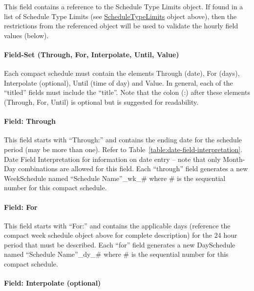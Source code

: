 This field contains a reference to the Schedule Type Limits object. If found in a list of Schedule Type Limits (see \hyperref[scheduletypelimits]{ScheduleTypeLimits} object above), then the restrictions from the referenced object will be used to validate the hourly field values (below).

\paragraph{Field-Set (Through, For, Interpolate, Until, Value)}\label{field-set-through-for-interpolate-until-value}

Each compact schedule must contain the elements Through (date), For (days), Interpolate (optional), Until (time of day) and Value. In general, each of the ``titled'' fields must include the ``title''. Note that the colon (:) after these elements (Through, For, Until) is optional but is suggested for readability.

\paragraph{Field: Through}\label{field-through}

This field starts with ``Through:'' and contains the ending date for the schedule period (may be more than one). Refer to Table~\ref{table:date-field-interpretation}. Date Field Interpretation for information on date entry -- note that only Month-Day combinations are allowed for this field. Each ``through'' field generates a new WeekSchedule named ``Schedule Name''\_wk\_\# where \# is the sequential number for this compact schedule.

\paragraph{Field: For}\label{field-for}

This field starts with ``For:'' and contains the applicable days (reference the compact week schedule object above for complete description) for the 24 hour period that must be described. Each ``for'' field generates a new DaySchedule named ``Schedule Name''\_dy\_\# where \# is the sequential number for this compact schedule.

\paragraph{Field: Interpolate (optional)}\label{field-interpolate-optional}

